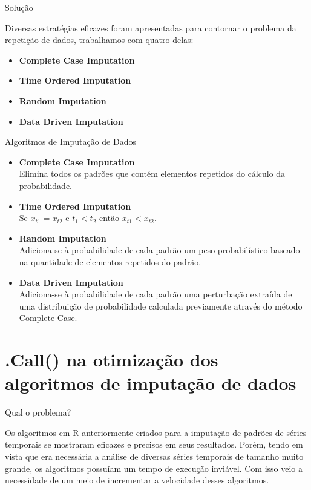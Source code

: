 \documentclass{beamer} %
\begin{document}
\begin{frame}{Solução}

Diversas estratégias eficazes foram apresentadas para contornar o problema da repetição de dados, trabalhamos com quatro delas:

\begin{itemize}
    \item \textbf{Complete Case Imputation}
    \item \textbf{Time Ordered Imputation}
    \item \textbf{Random Imputation}
    \item \textbf{Data Driven Imputation}\cite{traversaro2018bandt}
\end{itemize}

\end{frame}

\begin{frame}{Algoritmos de Imputação de Dados}

\begin{itemize}
    \item \textbf{Complete Case Imputation}\\
    Elimina todos os padrões que contém elementos repetidos do cálculo da probabilidade.
    \item \textbf{Time Ordered Imputation}\\
    Se $x_{t1} = x_{t2}$ e $t_{1} < t_{2}$ então $x_{t1} < x_{t2}$.
    \item \textbf{Random Imputation}\\
    Adiciona-se à probabilidade de cada padrão um peso probabilístico baseado na quantidade de elementos repetidos do padrão.
    \item \textbf{Data Driven Imputation}\\
    Adiciona-se à probabilidade de cada padrão uma perturbação extraída de uma distribuição de probabilidade calculada previamente através do método Complete Case.
\end{itemize}
    
\end{frame}

\section{.Call() na otimização dos algoritmos de imputação de dados}

\begin{frame}{Qual o problema?}

Os algoritmos em R anteriormente criados para a imputação de padrões de séries temporais se mostraram eficazes e precisos em seus resultados. Porém, tendo em vista que era necessária a análise de diversas séries temporais de tamanho muito grande, os algoritmos possuíam um tempo de execução inviável. Com isso veio a necessidade de um meio de incrementar a velocidade desses algoritmos.
    
\end{frame}
\end{document}
